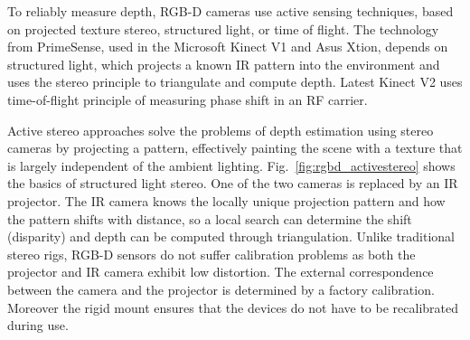 	To reliably measure depth, RGB-D cameras use active sensing techniques, based on projected texture stereo, structured light, or time of flight. The technology from PrimeSense, used in the Microsoft Kinect V1\cite{Kinect2014} and Asus Xtion, depends on structured light, which projects a known IR pattern into the environment and uses the stereo principle to triangulate and compute depth. Latest Kinect V2 uses time-of-flight principle of measuring phase shift in an RF carrier.
	 
	Active stereo approaches solve the problems of depth estimation using stereo cameras by projecting a pattern, effectively painting the scene with a texture that is largely independent of the ambient lighting. Fig.~\ref{fig:rgbd_activestereo} shows the basics of structured light stereo. One of the two cameras is replaced by an IR projector. The IR camera knows the locally unique projection pattern and how the pattern shifts with distance, so a local search can determine the shift (disparity) and depth can be computed through triangulation. Unlike traditional stereo rigs, RGB-D sensors do not suffer calibration problems as both the projector and IR camera exhibit low distortion. The external correspondence between the camera and the projector is determined by a factory calibration. Moreover the rigid mount ensures that the devices do not have to be recalibrated during use.
	
